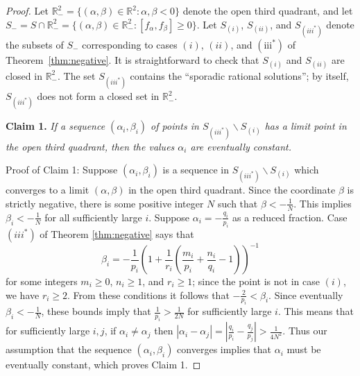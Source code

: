 \documentclass[11pt, letterpaper, reqno]{amsart}
\newenvironment{customthm}[1]
  {\renewcommand\theinnercustomthm{#1}\innercustomthm}
  {\endinnercustomthm}
\theoremstyle{definition}
\theoremstyle{remark}
\numberwithin{equation}{section}
\newcommand{\RR}{\ensuremath{\mathbb{R}}}
\newcommand{\floor}[1]{\lfloor{#1}\rfloor}
\newcommand{\Qthree}{\RR^2_{-}}
\newcommand{\Si}{S_{(i)}}
\newcommand{\Sii}{S_{(ii)}}
\newcommand{\Siii}{S_{(iii^*)}}
\begin{document}

\begin{proof} 
Let $\RR^2_{-} = \{ (\alpha,\beta) \in \RR^2 : \alpha, \beta < 0 \}$
denote the open third quadrant,
and let 
$
S_{-} = S\cap \Qthree = \{ (\alpha,\beta) \in \Qthree : %
[f_\alpha,f_\beta]\geq 0\}$.
Let $\Si$, $\Sii$, and $\Siii$  
denote the subsets of $S_{-}$
corresponding to cases $(i)$, $(ii)$, and $(\text{iii}^{\ast})$ of Theorem~\ref{thm:negative}.
It is straightforward to check that  $\Si$ and $\Sii$ are closed in $\RR^2_{-}$.
The set $\Siii$  contains the ``sporadic rational solutions'';
 by itself,
$\Siii$ does not form a closed set in $\RR^2_{-}$. 


{\bf Claim 1.} {\em If a sequence $(\alpha_i,\beta_i)$ of points in $\Siii \smallsetminus \Si$ 
has a limit point in the open third quadrant,
then the values $\alpha_i$ are eventually constant.}

Proof of Claim 1: 
Suppose $(\alpha_i, \beta_i)$ is a sequence in $\Siii \smallsetminus \Si $ which 
 converges to a limit $(\alpha, \beta)$ in the open third quadrant.
Since the coordinate $ \beta$ is strictly negative, there is some positive integer $N$ such that 
$\beta < - \frac{1}{N}$.
This implies  $\beta_i < -\frac{1}{N}$
for all sufficiently large $i$.
Suppose $\alpha_i = - \frac{q_i}{p_i}$ as a reduced fraction.
Case $(iii^*)$ of Theorem \ref{thm:negative} says that
\begin{equation}
\label{eq:beta}
 \beta_i = -\frac{1}{p_i} \left(1 + \frac1{r_i} \left(\frac{m_i}{p_i} + \frac{n_i}{q_i} - 1 \right) \right)^{-1}
\end{equation}
for some integers $m_i \geq 0$, $n_i \geq 1$, and $r_i \geq 1$;
since the point is not in case $(i)$, we have $r_i \geq 2$.
From these conditions it follows that 
$-\frac{2}{p_i} < \beta_i $.
Since eventually $\beta_i < -\frac{1}{N}$, these bounds 
 imply that $\frac1{p_i} > \frac1{2N}$ %
 for sufficiently large $i$.
This means that for sufficiently large $i,j$, if $\alpha_i \neq \alpha_j$ then 
$ 
|\alpha_i - \alpha_j | = \left|\frac{q_i}{p_i} - \frac{q_j}{p_j} \right| 
> \frac{1}{4N^2} 
.$
Thus our assumption that the sequence $(\alpha_i, \beta_i)$ converges implies that $\alpha_i$ 
must be eventually constant,
which proves  Claim 1.


\end{proof}
\end{document}

